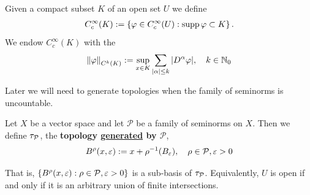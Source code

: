 \documentclass[
    a4paper,
    DIV=14,
    abstract=true,
    numbers=noenddot
]{scrartcl}
\begin{document}
\begin{definition}
	Given a compact subset $K$ of an open set  $U$ we define
	\begin{align*}
		C_c^\infty(K):= \left\{\varphi \in C_c^\infty(U): \operatorname{supp}{\varphi} \subset K \right\} .
	\end{align*}
	We endow  $C_c^\infty(K)$ with the 
	\begin{align}\label{local smooth norms}
		\left\lVert \varphi \right\rVert_{C^k(K)}:= \sup_{x \in K} \sum_{{\left| \alpha \right|}\leq k } {\left| D^\alpha \varphi \right|}, \quad  k \in \mathbb{N}_{0}
	\end{align}
\end{definition}
Later we will need to generate topologies when the family of seminorms is uncountable.
\begin{definition}
	Let $X$ be a vector space and let $\mathcal{P}$ be a family of seminorms on $X$. Then we define $\tau_{\mathcal{P}}$, the \textbf{topology \href{https://en.wikipedia.org/wiki/Subbase}{generated} by $\mathcal{P}$},
	\begin{align*}
	B^\rho(x,\varepsilon):=x+\rho^{-1}(B_\varepsilon), \quad \rho \in \mathcal{P}, \varepsilon >0
	\end{align*}
\end{definition}
That is, $\left\{B^\rho(x,\varepsilon): \rho \in \mathcal{P}, \varepsilon>0\right\} $ is a sub-basis of $\tau_{\mathcal{P}}$. Equivalently, $U$ is open if and only if it is an arbitrary union of finite intersections.
\end{document}
